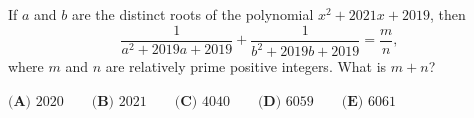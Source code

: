 If $a$ and $b$ are the distinct roots of the polynomial $x^2+2021x+2019$, then
\[\dfrac{1}{a^2+2019a+2019}+\dfrac{1}{b^2+2019b+2019}=\dfrac mn,\]
where $m$ and $n$ are relatively prime positive integers. What is $m+n$?

$\textbf{(A) }2020\qquad\textbf{(B) } 2021\qquad\textbf{(C) } 4040\qquad\textbf{(D) } 6059\qquad\textbf{(E) }6061$
